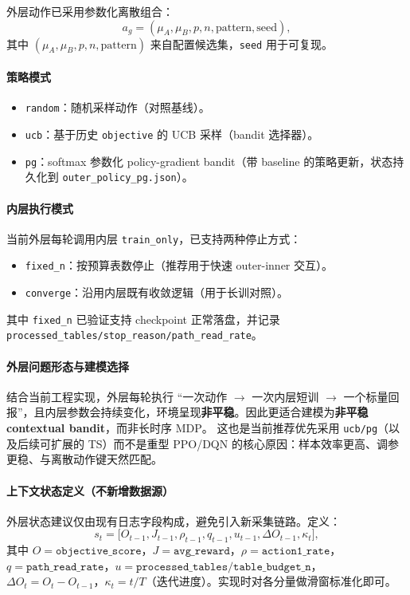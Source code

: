 \documentclass[UTF8,11pt,a4paper]{ctexart}
\begin{document}
外层动作已采用参数化离散组合：
\begin{equation}
a_g=(\mu_A,\mu_B,p,n,\text{pattern},\text{seed}),
\end{equation}
其中 $(\mu_A,\mu_B,p,n,\text{pattern})$ 来自配置候选集，\texttt{seed} 用于可复现。

\paragraph{策略模式}
\begin{itemize}
\item \texttt{random}：随机采样动作（对照基线）。
\item \texttt{ucb}：基于历史 \texttt{objective} 的 UCB 采样（bandit 选择器）。
\item \texttt{pg}：softmax 参数化 policy-gradient bandit（带 baseline 的策略更新，状态持久化到 \texttt{outer\_policy\_pg.json}）。
\end{itemize}

\paragraph{内层执行模式}
当前外层每轮调用内层 \texttt{train\_only}，已支持两种停止方式：
\begin{itemize}
\item \texttt{fixed\_n}：按预算表数停止（推荐用于快速 outer-inner 交互）。
\item \texttt{converge}：沿用内层既有收敛逻辑（用于长训对照）。
\end{itemize}
其中 \texttt{fixed\_n} 已验证支持 checkpoint 正常落盘，并记录 \texttt{processed\_tables/stop\_reason/path\_read\_rate}。

\paragraph{外层问题形态与建模选择}
结合当前工程实现，外层每轮执行 ``一次动作 $\rightarrow$ 一次内层短训 $\rightarrow$ 一个标量回报''，且内层参数会持续变化，环境呈现\textbf{非平稳}。因此更适合建模为\textbf{非平稳 contextual bandit}，而非长时序 MDP。
这也是当前推荐优先采用 \texttt{ucb/pg}（以及后续可扩展的 TS）而不是重型 PPO/DQN 的核心原因：样本效率更高、调参更稳、与离散动作键天然匹配。

\paragraph{上下文状态定义（不新增数据源）}
外层状态建议仅由现有日志字段构成，避免引入新采集链路。定义：
\begin{equation}
s_t=\big[O_{t-1},J_{t-1},\rho_{t-1},q_{t-1},u_{t-1},\Delta O_{t-1},\kappa_t\big],
\end{equation}
其中 $O=\texttt{objective\_score}$，$J=\texttt{avg\_reward}$，$\rho=\texttt{action1\_rate}$，
$q=\texttt{path\_read\_rate}$，$u=\texttt{processed\_tables}/\texttt{table\_budget\_n}$，
$\Delta O_t=O_t-O_{t-1}$，$\kappa_t=t/T$（迭代进度）。实现时对各分量做滑窗标准化即可。
\end{document}
